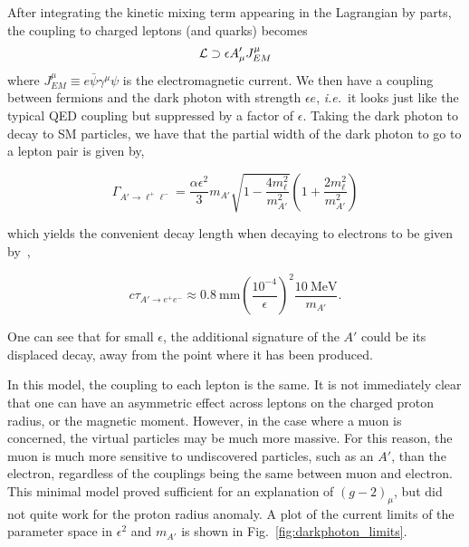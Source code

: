 After integrating the kinetic mixing term appearing in the Lagrangian by parts, the coupling to charged leptons (and quarks) becomes
\begin{equation}
    \label{eqn:darkphoton_qed_current}
    \operatorname{\mathcal{L}} \supset \epsilon A'_\mu J^\mu_{EM}
\end{equation}
where $J^\mu_{EM} \equiv e \bar{\psi} \gamma^\mu \psi$ is the electromagnetic current.
We then have a coupling between fermions and the dark photon with strength $\epsilon e$, {\em i.e.}\ it looks just like the typical QED coupling but suppressed by a factor of $\epsilon$.
Taking the dark photon to decay to SM particles, we have that the partial width of the dark photon to go to a lepton pair is given by,

\begin{equation}
    \Gamma_{A' \rightarrow \ell^+ \ell^-} = \frac{\alpha \epsilon^2}{3} m_{A'} \sqrt{1-\frac{4 m_\ell^2}{m_{A'}^2}}\left(1 + \frac{2 m_\ell^2}{m_{A'}^2}\right)
\end{equation}

\noindent which yields the convenient decay length when decaying to electrons to be given by~\cite{Echenard:2014lma},

\begin{equation}
    c \tau_{A' \rightarrow e^+ e^-} \approx 0.8~\textrm{mm} \left(\frac{10^{-4}}{\epsilon}\right)^2 \frac{10~\textrm{MeV}}{m_{A'}}\textrm{.}
\end{equation}

\noindent One can see that for small $\epsilon$, the additional signature of the $A'$ could be its displaced decay, away from the point where it has been produced.

In this model, the coupling to each lepton is the same.
It is not immediately clear that one can have an asymmetric effect across leptons on the charged proton radius, or the magnetic moment.
However, in the case where a muon is concerned, the virtual particles may be much more massive.
For this reason, the muon is much more sensitive to undiscovered particles, such as an $A'$, than the electron, regardless of the couplings being the same between muon and electron.
This minimal model proved sufficient for an explanation of $(g-2)_\mu$, but did not quite work for the proton radius anomaly.
A plot of the current limits of the parameter space in $\epsilon^2$ and $m_{A'}$ is shown in Fig.~\ref{fig:darkphoton_limits}.

